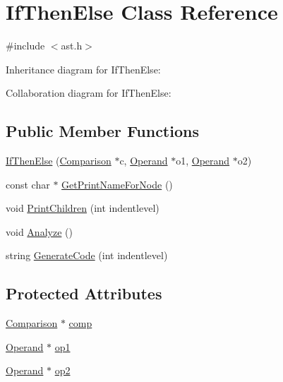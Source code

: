 \hypertarget{class_if_then_else}{}\section{If\+Then\+Else Class Reference}
\label{class_if_then_else}


{\ttfamily \#include $<$ast.\+h$>$}



Inheritance diagram for If\+Then\+Else\+:


Collaboration diagram for If\+Then\+Else\+:
\subsection*{Public Member Functions}
\begin{DoxyCompactItemize}
\item 
\hyperlink{class_if_then_else_a50abd04ed19a72523948a23a072c8ead}{If\+Then\+Else} (\hyperlink{class_comparison}{Comparison} $\ast$c, \hyperlink{class_operand}{Operand} $\ast$o1, \hyperlink{class_operand}{Operand} $\ast$o2)
\item 
const char $\ast$ \hyperlink{class_if_then_else_a6fff2f19c2fc487ca21b2fabb358169e}{Get\+Print\+Name\+For\+Node} ()
\item 
void \hyperlink{class_if_then_else_a868f2a8cc77bd5512ea54edaf81aa004}{Print\+Children} (int indentlevel)
\item 
void \hyperlink{class_if_then_else_a4c6beae98e9fe6d40836fdca839d76a7}{Analyze} ()
\item 
string \hyperlink{class_if_then_else_adc0bd51e42fed9dd67b67253dd77665a}{Generate\+Code} (int indentlevel)
\end{DoxyCompactItemize}
\subsection*{Protected Attributes}
\begin{DoxyCompactItemize}
\item 
\hyperlink{class_comparison}{Comparison} $\ast$ \hyperlink{class_if_then_else_a4a1ba1f798d5682dbb1006cda209d325}{comp}
\item 
\hyperlink{class_operand}{Operand} $\ast$ \hyperlink{class_if_then_else_a46474bc5e459898beef1eaf8456adb9d}{op1}
\item 
\hyperlink{class_operand}{Operand} $\ast$ \hyperlink{class_if_then_else_a8c9663fc824f5b748bac322d01c3da84}{op2}
\end{DoxyCompactItemize}


